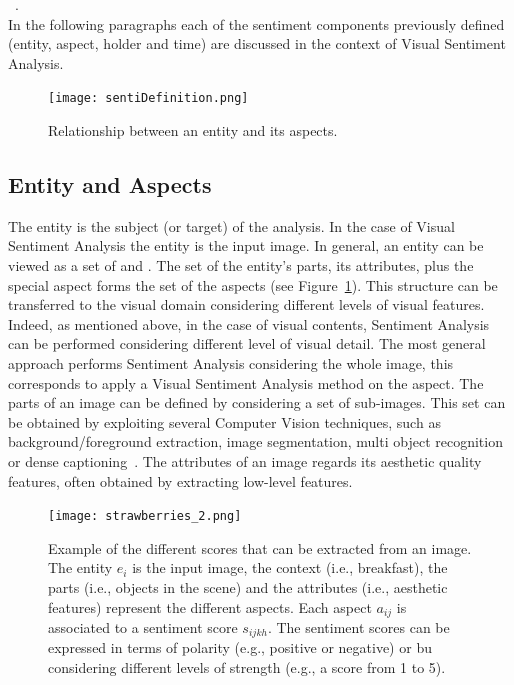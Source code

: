 \textit{}~\cite{hanjalic2006extracting}.
\\

In the following paragraphs each of the sentiment components previously defined (entity, aspect, holder and time) are discussed in the context of Visual Sentiment Analysis.

\begin{figure}[t]
	\centering
	\texttt{[image: sentiDefinition.png]}
	\caption{Relationship between an entity and its aspects.}
	\label{figDefinition}
\end{figure}

\subsection{Entity and Aspects}
The entity is the subject (or target) of the analysis. In the case of Visual Sentiment Analysis the entity is the input image. 
In general, an entity can be viewed as a set of  and . The set of the entity's parts, its attributes, plus the special aspect  forms the set of the aspects (see Figure~\ref{figDefinition}).
This structure can be transferred to the visual domain considering different levels of visual features.
Indeed, as mentioned above, in the case of visual contents, Sentiment Analysis can be performed considering different level of visual detail. The most general approach performs Sentiment Analysis considering the whole image, this corresponds to apply a Visual Sentiment Analysis method on the  aspect.
The parts of an image can be defined by considering a set of sub-images. This set can be obtained by exploiting several Computer Vision techniques, such as background/foreground extraction, image segmentation, multi object recognition or dense captioning~\cite{Karpathy_2015_CVPR, karpathy2015deep}. The attributes of an image regards its aesthetic quality features, often obtained by extracting low-level features.
\begin{figure}
	\centering
	\texttt{[image: strawberries\_2.png]}
	\caption{Example of the different scores that can be extracted from an image. The entity $e_i$ is the input image, the context (i.e., breakfast), the parts (i.e., objects in the scene) and the attributes (i.e., aesthetic features) represent the different aspects. Each aspect $a_{ij}$ is associated to a sentiment score $s_{ijkh}$. The sentiment scores can be expressed in terms of polarity (e.g., positive or negative) or bu considering different levels of strength (e.g., a score from 1 to 5).}
	\label{figBreakfast}
\end{figure}
